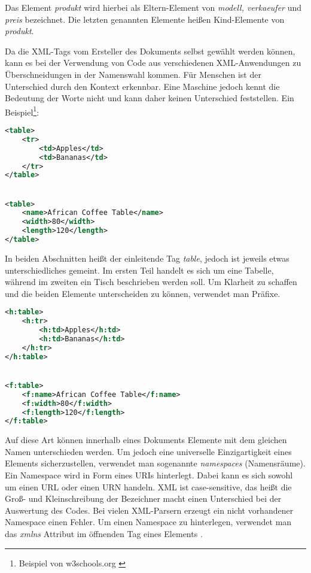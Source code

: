 Das Element \textit{produkt} wird hierbei als Eltern-Element von \textit{modell, verkaeufer} und \textit{preis} bezeichnet. Die letzten genannten Elemente heißen Kind-Elemente von \textit{produkt}.
 
Da die XML-Tags vom Ersteller des Dokuments selbst gewählt werden können, kann es bei der Verwendung von Code aus verschiedenen \ac{XML}-Anwendungen  zu Überschneidungen in der Namenswahl kommen. Für Menschen ist der Unterschied durch den Kontext erkennbar. Eine Maschine jedoch kennt die Bedeutung der Worte nicht und kann daher keinen Unterschied feststellen. Ein Beispiel\footnote{Beispiel von w3schools.org \cite{w3s}}: \\

\begin{lstlisting}[title=Beispiel Überschneidung von \ac{XML}-Bezeichnern, language=XML,  morekeywords={table, tr, td, name, width, length}]
<table>
	<tr>
		<td>Apples</td>
		<td>Bananas</td>
	</tr>
</table>


<table>
	<name>African Coffee Table</name>
	<width>80</width>
	<length>120</length>
</table>
\end{lstlisting}

In beiden Abschnitten heißt der einleitende Tag \textit{table}, jedoch ist jeweils etwas unterschiedliches gemeint. Im ersten Teil handelt es sich um eine Tabelle, während im zweiten ein Tisch beschrieben werden soll. Um Klarheit zu schaffen und die beiden Elemente unterscheiden zu können, verwendet man Präfixe. \\

\begin{lstlisting}[title=Lösung des Namenskonfliktes durch Verwendung der Präfixe \textit{h:} und \textit{f:}, language=XML,  morekeywords={h:table, h:tr, h:td, f:name, f:width, f:length, f:table}]
<h:table>
	<h:tr>
		<h:td>Apples</h:td>
		<h:td>Bananas</h:td>
	</h:tr>
</h:table>


<f:table>
	<f:name>African Coffee Table</f:name>
	<f:width>80</f:width>
	<f:length>120</f:length>
</f:table>
\end{lstlisting}

Auf diese Art können innerhalb eines Dokuments Elemente mit dem gleichen Namen unterschieden werden. Um jedoch eine universelle Einzigartigkeit eines Elements sicherzustellen, verwendet man sogenannte \textit{namespaces} (Namensräume). Ein Namespace wird in Form eines \acp{URI} hinterlegt. Dabei kann es sich sowohl um einen \ac{URL} oder einen \ac{URN} handeln. \ac{XML} ist case-sensitive, das heißt die Groß- und Kleinschreibung der Bezeichner macht einen Unterschied bei der Auswertung des Codes. Bei vielen \ac{XML}-Parsern erzeugt ein nicht vorhandener Namespace einen Fehler.
Um einen Namespace zu hinterlegen, verwendet man das \textit{xmlns} Attribut im öffnenden Tag eines Elements \cite{undxml}. \\ 

